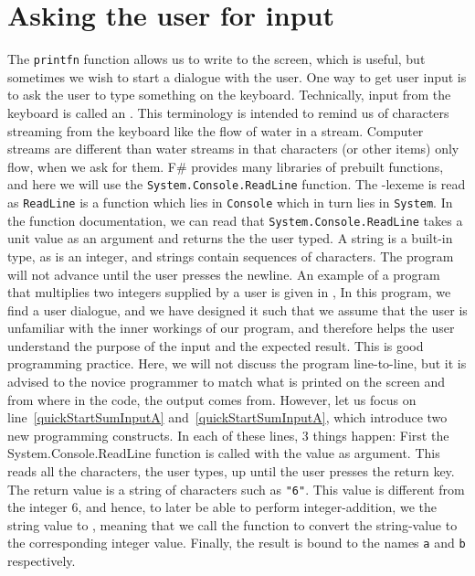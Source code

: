 \documentclass[fsharpNotes.tex]{subfiles}
\begin{document}
\section{Asking the user for input}
\label{sec:readline}
The \lstinline{printfn} function allows us to write to the screen, which is useful, but sometimes we wish to start a dialogue with the user. One way to get user input is to ask the user to type something on the keyboard. Technically, input from the keyboard is called an  . This terminology is intended to remind us of characters streaming from the keyboard like the flow of water in a stream. Computer streams are different than water streams in that characters (or other items) only flow, when we ask for them. F\# provides many libraries of prebuilt functions, and here we will use the \lstinline{System.Console.ReadLine} function. The -lexeme is read as \lstinline{ReadLine} is a function which lies in \lstinline{Console} which in turn lies in \lstinline{System}. In the function documentation, we can read that \lstinline{System.Console.ReadLine} takes a unit value as an argument and returns the  the user typed. A string is a built-in type, as is an integer, and strings contain sequences of characters. The program will not advance until the user presses the newline. An example of a program that multiplies two integers supplied by a user is given in ,
% 
%
In this program, we find a user dialogue, and we have designed it such that we assume that the user is unfamiliar with the inner workings of our program, and therefore helps the user understand the purpose of the input and the expected result. This is good programming practice. Here, we will not discuss the program line-to-line, but it is advised to the novice programmer to match what is printed on the screen and from where in the code, the output comes from. However, let us focus on line~\ref{quickStartSumInputA} and~\ref{quickStartSumInputA}, which introduce two new programming constructs. In each of these lines, 3 things happen: First the System.Console.ReadLine function is called with the \lexeme{()} value as argument. This reads all the characters, the user types, up until the user presses the return key. The return value is a string of characters such as \lstinline{"6"}. This value is different from the integer 6, and hence, to later be able to perform integer-addition, we  the string value to , meaning that we call the function  to convert the string-value to the corresponding integer value. Finally, the result is bound to the names \lstinline{a} and \lstinline{b} respectively.
\end{document}
